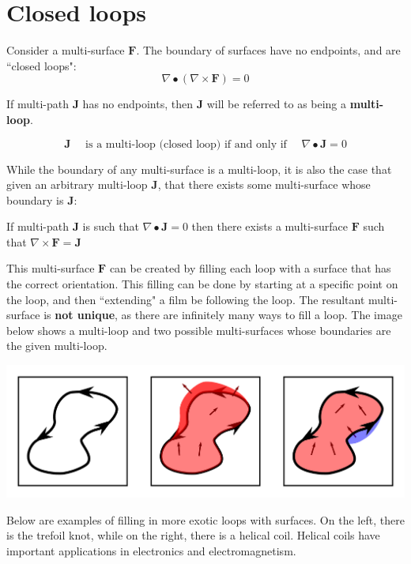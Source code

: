 \section{Closed loops}\label{sec:closed_loops}

Consider a multi-surface \(\mathbf{F}\). The boundary of surfaces have no endpoints, and are ``closed loops":
\[\nabla \bullet (\nabla \times \mathbf{F}) = 0\]    

If multi-path \(\mathbf{J}\) has no endpoints, then \(\mathbf{J}\) will be referred to as being a {\bf multi-loop}.

\[\mathbf{J} \quad\text{ is a multi-loop (closed loop) if and only if }\quad \nabla \bullet \mathbf{J} = 0\]

While the boundary of any multi-surface is a multi-loop, it is also the case that given an arbitrary multi-loop \(\mathbf{J}\), that there exists some multi-surface whose boundary is \(\mathbf{J}\):

\begin{thm}\label{thm:filling_closed_loops}
If multi-path \(\mathbf{J}\) is such that \(\nabla \bullet \mathbf{J} = 0\) then there exists a multi-surface \(\mathbf{F}\) such that \(\nabla \times \mathbf{F} = \mathbf{J}\)
\end{thm}

This multi-surface \(\mathbf{F}\) can be created by filling each loop with a surface that has the correct orientation. This filling can be done by starting at a specific point on the loop, and then ``extending" a film be following the loop. The resultant multi-surface is {\bf not unique}, as there are infinitely many ways to fill a loop. The image below shows a multi-loop and two possible multi-surfaces whose boundaries are the given multi-loop. 

\begin{center}
\includegraphics[width = \textwidth]{Boundaries/Surface_boundaries/surface_filling}
\end{center}

Below are examples of filling in more exotic loops with surfaces. On the left, there is the trefoil knot, while on the right, there is a helical coil. Helical coils have important applications in electronics and electromagnetism. 

